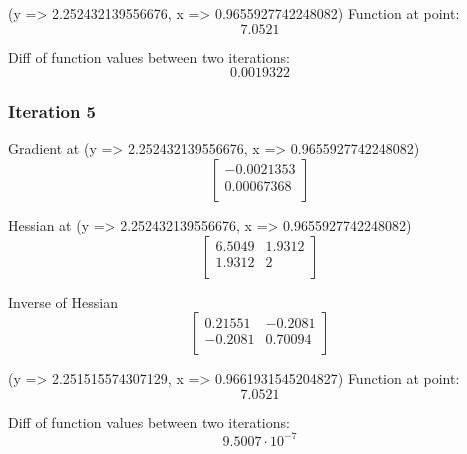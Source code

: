 \documentclass{article}
\begin{document}
(y => 2.252432139556676, x => 0.9655927742248082)
Function at point:
\begin{equation}
7.0521
\end{equation}

Diff of function values between two iterations:
\begin{equation}
0.0019322
\end{equation}

\subsubsection{Iteration 5}
Gradient at (y => 2.252432139556676, x => 0.9655927742248082)
\begin{equation}
\left[
\begin{array}{c}
-0.0021353 \\
0.00067368 \\
\end{array}
\right]
\end{equation}

Hessian at (y => 2.252432139556676, x => 0.9655927742248082)
\begin{equation}
\left[
\begin{array}{cc}
6.5049 & 1.9312 \\
1.9312 & 2 \\
\end{array}
\right]
\end{equation}

Inverse of Hessian
\begin{equation}
\left[
\begin{array}{cc}
0.21551 & -0.2081 \\
-0.2081 & 0.70094 \\
\end{array}
\right]
\end{equation}

(y => 2.251515574307129, x => 0.9661931545204827)
Function at point:
\begin{equation}
7.0521
\end{equation}

Diff of function values between two iterations:
\begin{equation}
9.5007 \cdot 10^{-7}
\end{equation}
\end{document}
